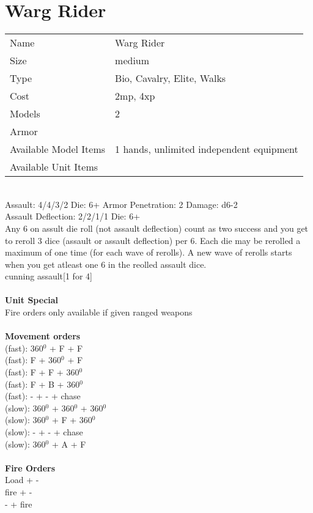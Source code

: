 






\pagebreak

\section{ Warg Rider }

\begin{tabular}{ll}
  Name & Warg Rider \\
  Size & medium\\
  Type & Bio, Cavalry, Elite, Walks\\
  Cost & 2mp, 4xp\\
  Models & 2\\
  Armor & \\
  Available Model Items & 1 hands, unlimited independent equipment \\
  Available Unit Items &  \\
\end{tabular}

\ \\
Assault: 4/4/3/2 Die: 6+ Armor Penetration: 2 Damage: d6-2 \\
Assault Deflection: 2/2/1/1 Die: 6+\\
\indent Any 6 on assult die roll (not assault deflection) count as two success and you get to reroll 3 dice (assault or assault deflection) per 6. Each die may be rerolled a maximum of one time (for each wave of rerolls). A new wave of rerolls starts when you get atleast one 6 in the reolled assault dice.\\ cunning assault[1 for 4] \\
\ \\

{\bf Unit Special} \\
Fire orders only available if given ranged weapons
\ \\


\ \\ {\bf Movement orders } \\
(fast): 360$^0$ + F + F \\
(fast): F + 360$^0$ + F \\
(fast): F + F + 360$^0$ \\
(fast): F + B + 360$^0$ \\
(fast): - + - + chase \\
(slow): 360$^0$ + 360$^0$ + 360$^0$ \\
(slow): 360$^0$ + F + 360$^0$ \\
(slow): - + - + chase \\
(slow): 360$^0$ + A + F \\
\ \\ {\bf Fire Orders } \\
Load + - \\
fire + - \\
- + fire \\



